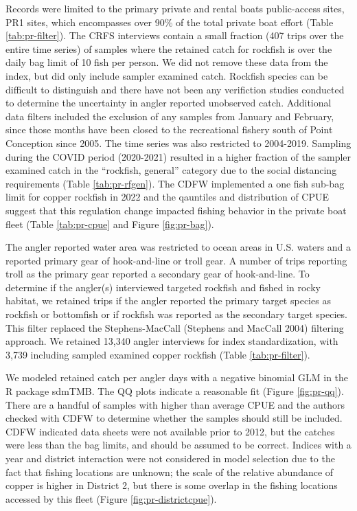 \documentclass[11pt,
  english,
  letterpaper,
]{article}
\begin{document}
Records were limited to the primary private and rental boats public-access sites, PR1 sites, which encompasses over 90\% of the total private boat effort (Table \ref{tab:pr-filter}). The CRFS interviews contain a small fraction (407 trips over the entire time series) of samples where the retained catch for rockfish is over the daily bag limit of 10 fish per person. We did not remove these data from the index, but did only include sampler examined catch. Rockfish species can be difficult to distinguish and there have not been any verifiction studies conducted to determine the uncertainty in angler reported unobserved catch. Additional data filters included the exclusion of any samples from January and February, since those months have been closed to the recreational fishery south of Point Conception since 2005. The time series was also restricted to 2004-2019. Sampling during the COVID period (2020-2021) resulted in a higher fraction of the sampler examined catch in the ``rockfish, general'' category due to the social distancing requirements (Table \ref{tab:pr-rfgen}). The CDFW implemented a one fish sub-bag limit for copper rockfish in 2022 and the qauntiles and distribution of CPUE suggest that this regulation change impacted fishing behavior in the private boat fleet (Table \ref{tab:pr-cpue} and Figure \ref{fig:pr-bag}).

The angler reported water area was restricted to ocean areas in U.S. waters and a reported primary gear of hook-and-line or troll gear. A number of trips reporting troll as the primary gear reported a secondary gear of hook-and-line. To determine if the angler(s) interviewed targeted rockfish and fished in rocky habitat, we retained trips if the angler reported the primary target species as rockfish or bottomfish or if rockfish was reported as the secondary target species. This filter replaced the Stephens-MacCall (Stephens and MacCall 2004) filtering approach. We retained 13,340 angler interviews for index standardization, with 3,739 including sampled examined copper rockfish (Table \ref{tab:pr-filter}).

We modeled retained catch per angler days with a negative binomial GLM in the R package sdmTMB. The QQ plots indicate a reasonable fit (Figure \ref{fig:pr-qq}). There are a handful of samples with higher than average CPUE and the authors checked with CDFW to determine whether the samples should still be included. CDFW indicated data sheets were not available prior to 2012, but the catches were less than the bag limits, and should be assumed to be correct. Indices with a year and district interaction were not considered in model selection due to the fact that fishing locations are unknown; the scale of the relative abundance of copper is higher in District 2, but there is some overlap in the fishing locations accessed by this fleet (Figure \ref{fig:pr-districtcpue}).
\end{document}
